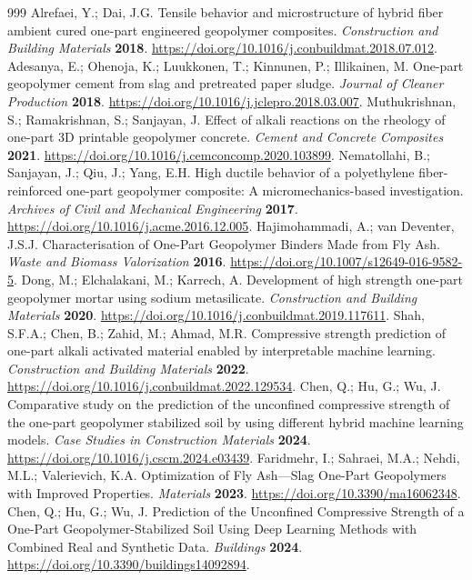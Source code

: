 \documentclass[materials,article,submit,pdftex,moreauthors]{Definitions/mdpi}
\begin{document}
\begin{thebibliography}{999}
Alrefaei, Y.; Dai, J.G. Tensile behavior and microstructure of hybrid fiber ambient cured one-part engineered geopolymer composites. {\em Construction and Building Materials} {\bf 2018}. \url{https://doi.org/10.1016/j.conbuildmat.2018.07.012}.
Adesanya, E.; Ohenoja, K.; Luukkonen, T.; Kinnunen, P.; Illikainen, M. One-part geopolymer cement from slag and pretreated paper sludge. {\em Journal of Cleaner Production} {\bf 2018}. \url{https://doi.org/10.1016/j.jclepro.2018.03.007}.
Muthukrishnan, S.; Ramakrishnan, S.; Sanjayan, J. Effect of alkali reactions on the rheology of one-part 3D printable geopolymer concrete. {\em Cement and Concrete Composites} {\bf 2021}. \url{https://doi.org/10.1016/j.cemconcomp.2020.103899}.
Nematollahi, B.; Sanjayan, J.; Qiu, J.; Yang, E.H. High ductile behavior of a polyethylene fiber-reinforced one-part geopolymer composite: A micromechanics-based investigation. {\em Archives of Civil and Mechanical Engineering} {\bf 2017}. \url{https://doi.org/10.1016/j.acme.2016.12.005}.
Hajimohammadi, A.; van Deventer, J.S.J. Characterisation of One-Part Geopolymer Binders Made from Fly Ash. {\em Waste and Biomass Valorization} {\bf 2016}. \url{https://doi.org/10.1007/s12649-016-9582-5}.
Dong, M.; Elchalakani, M.; Karrech, A. Development of high strength one-part geopolymer mortar using sodium metasilicate. {\em Construction and Building Materials} {\bf 2020}. \url{https://doi.org/10.1016/j.conbuildmat.2019.117611}.
Shah, S.F.A.; Chen, B.; Zahid, M.; Ahmad, M.R. Compressive strength prediction of one-part alkali activated material enabled by interpretable machine learning. {\em Construction and Building Materials} {\bf 2022}. \url{https://doi.org/10.1016/j.conbuildmat.2022.129534}.
Chen, Q.; Hu, G.; Wu, J. Comparative study on the prediction of the unconfined compressive strength of the one-part geopolymer stabilized soil by using different hybrid machine learning models. {\em Case Studies in Construction Materials} {\bf 2024}. \url{https://doi.org/10.1016/j.cscm.2024.e03439}.
Faridmehr, I.; Sahraei, M.A.; Nehdi, M.L.; Valerievich, K.A. Optimization of Fly Ash—Slag One-Part Geopolymers with Improved Properties. {\em Materials} {\bf 2023}. \url{https://doi.org/10.3390/ma16062348}.
Chen, Q.; Hu, G.; Wu, J. Prediction of the Unconfined Compressive Strength of a One-Part Geopolymer-Stabilized Soil Using Deep Learning Methods with Combined Real and Synthetic Data. {\em Buildings} {\bf 2024}. \url{https://doi.org/10.3390/buildings14092894}.

\end{thebibliography}
\end{document}
